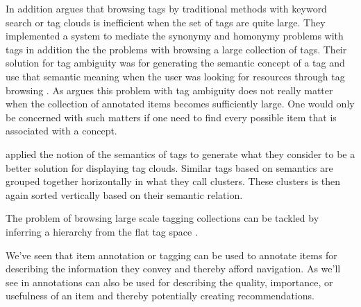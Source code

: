 In addition \citet[]{li07} argues that browsing tags by traditional
methods with keyword search or tag clouds is inefficient when the set of tags
are quite large. They implemented a system to mediate the synonymy and
homonymy problems with tags in addition the the problems with browsing a large
collection of tags. Their solution for tag ambiguity
was for generating the semantic concept%
of a tag and use that semantic meaning
when the user was looking for resources through tag browsing
\citep[]{li07}.
As \citet[]{weinberger07} argues this problem
with tag ambiguity does not really matter when the collection of annotated
items becomes sufficiently large. One would only be concerned with such
matters if one need to find every possible item that is associated with a
concept.

\citet[]{hassan06} applied the notion of the semantics of tags to
generate what they consider to be a better solution for displaying tag clouds.
Similar tags based on semantics are grouped together horizontally in what they
call clusters. These clusters is then again sorted vertically based on their
semantic relation.

The problem of browsing large scale tagging collections can be tackled by
inferring a hierarchy%
from the flat tag space \citep[]{li07}.

\parabreak

We've seen that item annotation or tagging can be used to annotate items for
describing the information they convey and
thereby afford navigation. As we'll see in
annotations can also be used for describing the quality, importance, or
usefulness of an item and thereby potentially creating recommendations.

